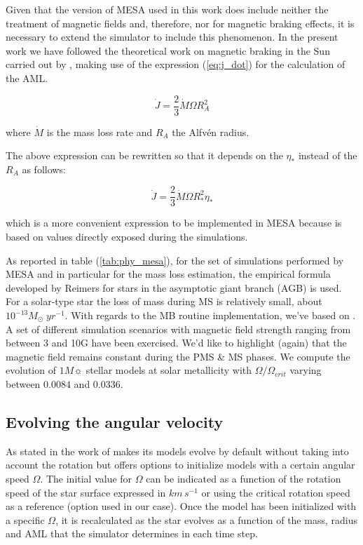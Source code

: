 \documentclass[fleqn,usenatbib]{mnras}
\begin{document}
Given that the version of MESA used in this work does include neither the treatment of magnetic fields and, therefore, nor for magnetic braking effects, it is necessary to extend the simulator to include this phenomenon. In the present work we have followed the theoretical work on magnetic braking in the Sun carried out by \citet{Weber1967}, making use of the expression (\ref{eq:j_dot}) for the calculation of the AML.
\begin{ceqn}
\begin{equation}
 \Dot{J} = \frac{2}{3} \Dot{M}\Omega R^{2}_{A} \label{eq:j_dot}
\end{equation}
\end{ceqn}
where $\Dot{M}$ is the mass loss rate and $R_A$ the Alfv\'{e}n radius. \par

The above expression can be rewritten so that it depends on the $\eta_*$ instead of the $R_A$ as follows:
\begin{ceqn}
\begin{equation}
 \Dot{J} = \frac{2}{3} \Dot{M}\Omega R^{2}_{*}\eta_* \label{eq:j_dot_mesa}
\end{equation}
\end{ceqn}
which is a more convenient expression to be implemented in MESA because is based on values directly exposed during the simulations.

As reported in table (\ref{tab:phy_mesa}), for the set of simulations performed by MESA and in particular for the mass loss estimation, the empirical formula developed by Reimers for stars in the asymptotic giant branch (AGB) is used.  For a solar-type star the loss of mass during MS is relatively small, about  $10^{-13}M_{\odot} \; yr^{-1}$. With regards to the MB routine implementation, we've based on \citet{Ud-Doula2007}. A set of different simulation scenarios with magnetic field strength ranging from between 3 and 10G have been exercised. We'd like to highlight (again) that the magnetic field remains constant during the PMS \& MS phases. We compute the evolution of $1M\sun$ stellar models at solar metallicity with $\Omega / \Omega_{crit}$ varying between $0.0084$ and $0.0336$.\par

\subsection{Evolving the angular velocity}
As stated in the work of \citet{Paxton2015} makes its models evolve by default without taking into account the rotation but offers options to initialize models with a certain angular speed $\Omega$. The initial value for $\Omega$ can be indicated as a function of the rotation speed of the star surface expressed in $km\,s^{-1}$ or using the critical rotation speed as a reference (option used in our case).  Once the model has been initialized with a specific $\Omega$, it is recalculated as the star evolves as a function of the mass, radius and AML that the simulator determines in each time step. \par
\end{document}
